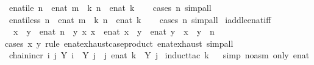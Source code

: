 \begin{isabellebody}
\isanewline
{}\isamarkupfalse%
\ enat{\isacharunderscore}ile{\isacharcolon}\ {\isachardoublequoteopen}n\ {\isasymle}\ enat\ m\ {\isasymLongrightarrow}\ {\isasymexists}k{\isachardot}\ n\ {\isacharequal}\ enat\ k{\isachardoublequoteclose}\isanewline
%
\isadelimproof
\ \ %
\endisadelimproof
%
\isatagproof
{}\isamarkupfalse%
\ {\isacharparenleft}cases\ n{\isacharparenright}\ simp{\isacharunderscore}all%
\endisatagproof
{\isafoldproof}%
%
\isadelimproof
\isanewline
%
\endisadelimproof
\isanewline
{}\isamarkupfalse%
\ enat{\isacharunderscore}iless{\isacharcolon}\ {\isachardoublequoteopen}n\ {\isacharless}\ enat\ m\ {\isasymLongrightarrow}\ {\isasymexists}k{\isachardot}\ n\ {\isacharequal}\ enat\ k{\isachardoublequoteclose}\isanewline
%
\isadelimproof
\ \ %
\endisadelimproof
%
\isatagproof
{}\isamarkupfalse%
\ {\isacharparenleft}cases\ n{\isacharparenright}\ simp{\isacharunderscore}all%
\endisatagproof
{\isafoldproof}%
%
\isadelimproof
\isanewline
%
\endisadelimproof
\isanewline
{}\isamarkupfalse%
\ iadd{\isacharunderscore}le{\isacharunderscore}enat{\isacharunderscore}iff{\isacharcolon}\isanewline
\ \ {\isachardoublequoteopen}x\ {\isacharplus}\ y\ {\isasymle}\ enat\ n\ {\isasymlongleftrightarrow}\ {\isacharparenleft}{\isasymexists}y{\isacharprime}\ x{\isacharprime}{\isachardot}\ x\ {\isacharequal}\ enat\ x{\isacharprime}\ {\isasymand}\ y\ {\isacharequal}\ enat\ y{\isacharprime}\ {\isasymand}\ x{\isacharprime}\ {\isacharplus}\ y{\isacharprime}\ {\isasymle}\ n{\isacharparenright}{\isachardoublequoteclose}\isanewline
%
\isadelimproof
%
\endisadelimproof
%
\isatagproof
{}\isamarkupfalse%
{\isacharparenleft}cases\ x\ y\ rule{\isacharcolon}\ enat{\isachardot}exhaust{\isacharbrackleft}case{\isacharunderscore}product\ enat{\isachardot}exhaust{\isacharbrackright}{\isacharparenright}\ simp{\isacharunderscore}all%
\endisatagproof
{\isafoldproof}%
%
\isadelimproof
\isanewline
%
\endisadelimproof
\isanewline
{}\isamarkupfalse%
\ chain{\isacharunderscore}incr{\isacharcolon}\ {\isachardoublequoteopen}{\isasymforall}i{\isachardot}\ {\isasymexists}j{\isachardot}\ Y\ i\ {\isacharless}\ Y\ j\ {\isasymLongrightarrow}\ {\isasymexists}j{\isachardot}\ enat\ k\ {\isacharless}\ Y\ j{\isachardoublequoteclose}\isanewline
%
\isadelimproof
%
\endisadelimproof
%
\isatagproof
{}\isamarkupfalse%
\ {\isacharparenleft}induct{\isacharunderscore}tac\ k{\isacharparenright}\isanewline
\ \isamarkupfalse%
\ {\isacharparenleft}simp\ {\isacharparenleft}no{\isacharunderscore}asm{\isacharparenright}\ only{\isacharcolon}\ enat{\isacharunderscore}{}{\isacharparenright}\isanewline

\end{isabellebody}
